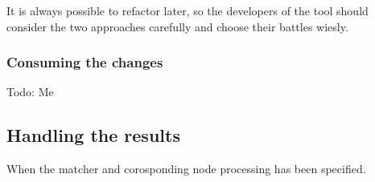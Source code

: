 It is always possible to refactor later, so the developers of the tool should consider the two approaches carefully and choose their battles wiesly.

\subsubsection*{Consuming the changes}

Todo: Me

\subsection{Handling the results} \label{subsec:080dev:HandlingToolResults}

When the matcher and corosponding node processing has been specified.